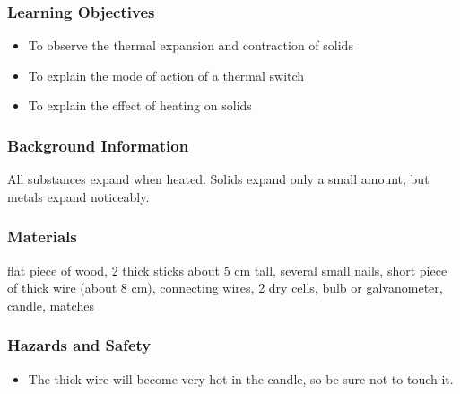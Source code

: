 \subsubsection*{Learning Objectives}
\begin{itemize}
\item{To observe the thermal expansion and contraction of solids} 
\item{To explain the mode of action of a thermal switch} 
\item{To explain the effect of heating on solids} 
\end{itemize}

\subsubsection*{Background Information}
All substances expand when heated. Solids expand only a small amount, but metals expand noticeably.  

\subsubsection*{Materials}
flat piece of wood, 2 thick sticks about 5 cm tall, several small nails, short piece of thick wire (about 8 cm), connecting wires, 2 dry cells, bulb or galvanometer, candle, matches

\subsubsection*{Hazards and Safety}
\begin{itemize}
\item{The thick wire will become very hot in the candle, so be sure not to touch it.} 
\end{itemize}

